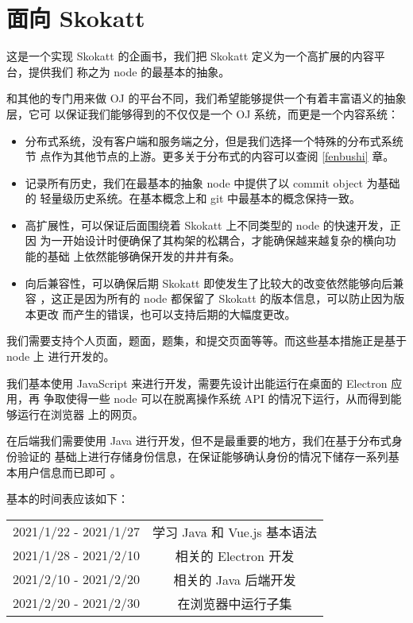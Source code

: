 
\section{面向 Skokatt}
这是一个实现 Skokatt 的企画书，我们把 Skokatt 定义为一个高扩展的内容平台，提供我们
称之为 node 的最基本的抽象。

和其他的专门用来做 OJ 的平台不同，我们希望能够提供一个有着丰富语义的抽象层，它可
以保证我们能够得到的不仅仅是一个 OJ 系统，而更是一个内容系统：

\begin{itemize}
    \item 分布式系统，没有客户端和服务端之分，但是我们选择一个特殊的分布式系统节
        点作为其他节点的上游。更多关于分布式的内容可以查阅 \ref{fenbushi} 章。
    \item 记录所有历史，我们在最基本的抽象 node 中提供了以 commit object 为基础的
        轻量级历史系统。在基本概念上和 git 中最基本的概念保持一致。
    \item 高扩展性，可以保证后面围绕着 Skokatt 上不同类型的 node 的快速开发，正因
        为一开始设计时便确保了其构架的松耦合，才能确保越来越复杂的横向功能的基础
        上依然能够确保开发的井井有条。
    \item 向后兼容性，可以确保后期 Skokatt 即使发生了比较大的改变依然能够向后兼容
        ，这正是因为所有的 node 都保留了 Skokatt 的版本信息，可以防止因为版本更改
        而产生的错误，也可以支持后期的大幅度更改。
\end{itemize}

我们需要支持个人页面，题面，题集，和提交页面等等。而这些基本措施正是基于 node 上
进行开发的。

我们基本使用 JavaScript 来进行开发，需要先设计出能运行在桌面的 Electron 应用，再
争取使得一些 node 可以在脱离操作系统 API 的情况下运行，从而得到能够运行在浏览器
上的网页。

在后端我们需要使用 Java 进行开发，但不是最重要的地方，我们在基于分布式身份验证的
基础上进行存储身份信息，在保证能够确认身份的情况下储存一系列基本用户信息而已即可
。

基本的时间表应该如下：

\begin{center}
\begin{tabular}{cc}
    \hline
    2021/1/22 - 2021/1/27 & 学习 Java 和 Vue.js 基本语法 \\
    2021/1/28 - 2021/2/10 & 相关的 Electron 开发 \\
    2021/2/10 - 2021/2/20 & 相关的 Java 后端开发 \\
    2021/2/20 - 2021/2/30 & 在浏览器中运行子集 \\
    \hline
\end{tabular}
\end{center}

